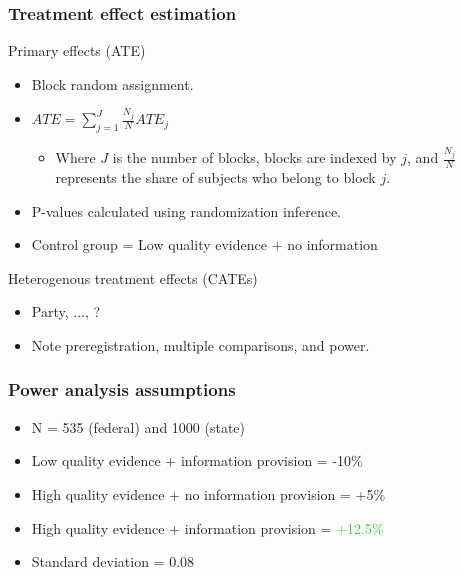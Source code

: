 \documentclass[usenames,dvipsnames]{beamer}
\begin{document}

\begin{frame}
\frametitle{Treatment effect estimation}

Primary effects (ATE)
\begin{itemize}
\item Block random assignment.
\item $ATE = \sum_{j = 1}^{J} \frac{N_j}{N}ATE_j$
\begin{itemize}
\item Where $J$ is the number of blocks, blocks are indexed by $j$, and $\frac{N_j}{N}$ represents the share of subjects who belong to block $j$. 
\end{itemize}
\item P-values calculated using randomization inference.
\item Control group = Low quality evidence + no information
\vspace{0.5cm}
\end{itemize}
Heterogenous treatment effects (CATEs)
\begin{itemize}
\item Party, ..., ?
\item Note preregistration, multiple comparisons, and power.
\end{itemize}

\end{frame}


\begin{frame}
\frametitle{Power analysis assumptions}

\begin{itemize}
\item N = 535 (federal) and 1000 (state)
\vspace{0.5cm}
\item Low quality evidence + information provision = \textcolor{BrickRed}{-10\%}
\item High quality evidence + no information provision = \textcolor{Emerald}{+5\%}
\item High quality evidence + information provision = \textcolor{LimeGreen}{+12.5\%}
\vspace{0.5cm}
\item Standard deviation = 0.08
\end{itemize}

\end{frame}

\end{document}
